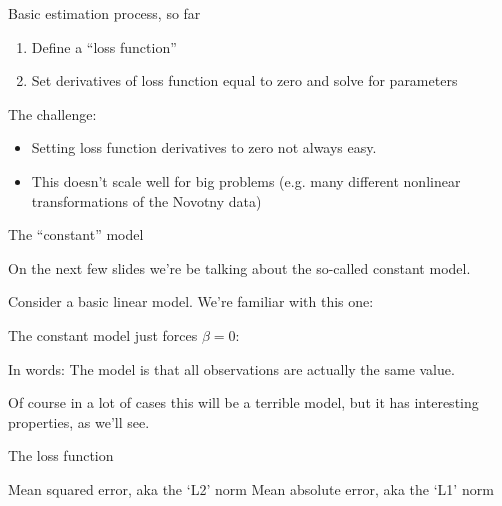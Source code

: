 \documentclass[aspectratio=169, handout]{beamer}
\begin{document}
\begin{frame}{Basic estimation process, so far}
\begin{enumerate}
\item Define a ``loss function''
\item Set derivatives of loss function equal to zero and solve for parameters
\end{enumerate}

\vspace{5mm}
The challenge:
\begin{itemize}
\item Setting loss function derivatives to zero not always easy.
\item This doesn't scale well for big problems (e.g. many different nonlinear transformations of the Novotny data)
\end{itemize}
\end{frame}

\begin{frame}{The ``constant'' model}

On the next few slides we're be talking about the so-called constant model.

\vspace{5mm}

Consider a basic linear model.  We're familiar with this one:

The constant model just forces $\beta = 0$:

In words: The model is that all observations are actually the same value.  

\vspace{5mm}

Of course in a lot of cases this will be a terrible model, but it has interesting properties, as we'll see.


\end{frame}

\begin{frame}{The loss function}

Mean squared error, aka the `L2' norm
Mean absolute error, aka the `L1' norm

\end{frame}
\end{document}
